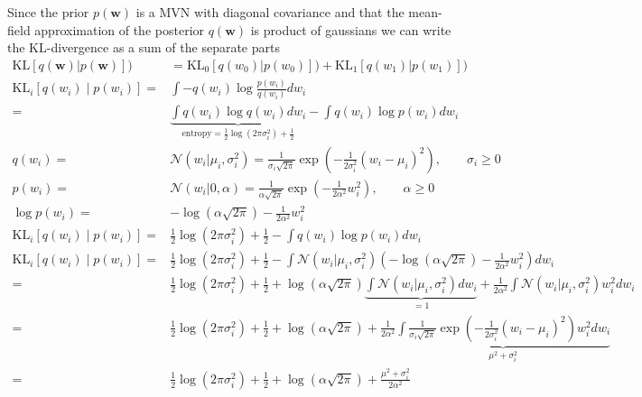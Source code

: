 \documentclass{article}
\begin{document}
Since the prior $p(\mathbf{w})$ is a MVN with diagonal covariance and that the mean-field approximation of the posterior $q(\mathbf{w})$ is product of gaussians we can write the KL-divergence as a sum of the separate parts
\begin{align}
	\text{KL}\left[q(\mathbf{w})| p(\mathbf{w})\right]) &= \text{KL}_0\left[q(w_0)| p(w_0)\right]) + \text{KL}_1\left[q(w_1)| p(w_1)\right]) \\
	\text{KL}_i[q(w_i)\mid p(w_i)] =& \int -q(w_i) \log\frac{p(w_i)}{q(w_i)} dw_i \\
	=& \underbrace{\int q(w_i) \log q(w_i) dw_i}_{\text{entropy} = \frac{1}{2}\log(2\pi\sigma_i^2)+\frac{1}{2}} - \int q(w_i) \log p(w_i) dw_i \\
	q(w_i) =& \mathcal{N}(w_i | \mu_i,\sigma_i^2) = \frac{1}{\sigma_i \sqrt{2\pi}}\exp(-\frac{1}{2\sigma_i^2}(w_i-\mu_i)^2), \qquad \sigma_i \geq 0 \\
	p(w_i) =& \mathcal{N}(w_i | 0,\alpha) =\frac{1}{\alpha \sqrt{2\pi}} \exp(-\frac{1}{2\alpha^2}w_i^2) , \qquad \alpha \geq 0\\
	\log p(w_i) =&-\log(\alpha \sqrt{2\pi}) -\frac{1}{2\alpha^2}w_i^2 \\
	\text{KL}_i[q(w_i)\mid p(w_i)] =& \frac{1}{2}\log(2\pi\sigma_i^2)+\frac{1}{2}- \int q(w_i) \log p(w_i) dw_i \\
	\text{KL}_i[q(w_i)\mid p(w_i)] =& \frac{1}{2}\log(2\pi\sigma_i^2)+\frac{1}{2}- \int \mathcal{N}(w_i | \mu_i,\sigma_i^2) \left(  -\log(\alpha \sqrt{2\pi}) -\frac{1}{2\alpha^2}w_i^2\right)  dw_i \\
	=& \frac{1}{2}\log(2\pi\sigma_i^2)+\frac{1}{2} + \log(\alpha \sqrt{2\pi})\underbrace{\int \mathcal{N}(w_i | \mu_i,\sigma_i^2)dw_i}_{=1} +\frac{1}{2\alpha^2}\int \mathcal{N}(w_i | \mu_i,\sigma_i^2)w_i^2  dw_i \\
	=& \frac{1}{2}\log(2\pi\sigma_i^2)+\frac{1}{2} + \log(\alpha \sqrt{2\pi}) +\frac{1}{2\alpha^2}\underbrace{\int \frac{1}{\sigma_i \sqrt{2\pi}}\exp(-\frac{1}{2\sigma_i^2}(w_i-\mu_i)^2)w_i^2  dw_i}_{\mu^2+\sigma_i^2} \\
	=& \frac{1}{2}\log(2\pi\sigma_i^2)+\frac{1}{2} + \log(\alpha \sqrt{2\pi}) +\frac{\mu^2+\sigma_i^2}{2\alpha^2}  \\
\end{align}
\end{document}
